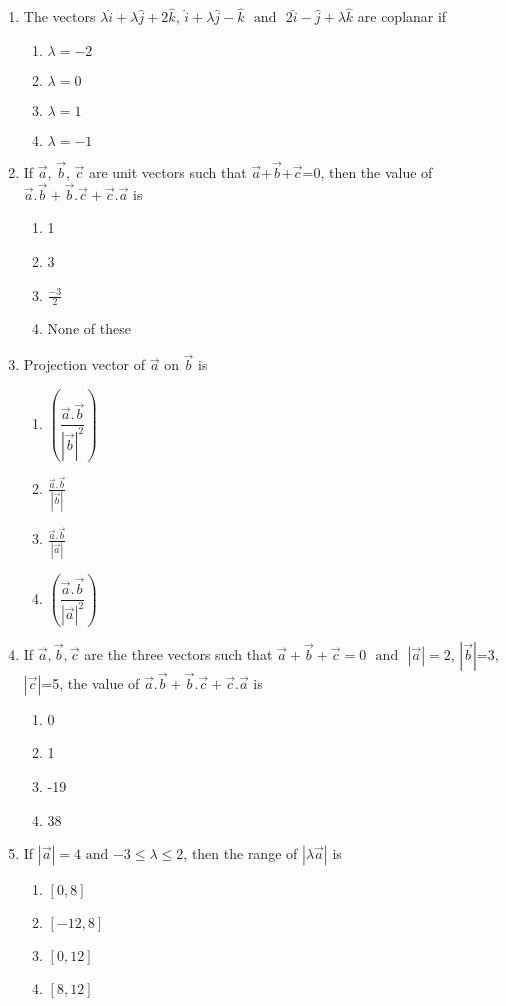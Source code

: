 \documentclass{article}
\providecommand{\abs}[1]{\left\vert#1\right\vert}
\begin{document}
\begin{enumerate}
\item The vectors $\lambda\hat{i}+\lambda\hat{j}+2\hat{k}$, $\hat{i}+\lambda\hat{j}-\hat{k}$ $\text{ and }$ $2\hat{i}-\hat{j}+\lambda\hat{k}$ are coplanar if
	\begin{enumerate}
\item	$\lambda=-2$
\item $\lambda=0$
\item $\lambda=1$
\item	$\lambda=-1$
\end{enumerate}


\item If $\vec{a}$, $\vec{b}$, $\vec{c}$ are unit vectors such that $\vec{a}$+$\vec{b}$+$\vec{c}$=0, then the value of $\vec{a}.\vec{b}+\vec{b}.\vec{c}+\vec{c}.\vec{a}$ is
	\begin{enumerate}
\item 1
\item 3
\item $\frac{-3}{2}$
\item None of these
\end{enumerate}



\item Projection vector of $\vec{a}$ on $\vec{b}$ is
	\begin{enumerate}
\item $\left(\dfrac{\vec{a}.\vec{b}}{\abs{\vec{b}}^2}\right)$
\item $\frac{\vec{a}.\vec{b}}{\abs{\vec{b}}}$
\item $\frac{\vec{a}.\vec{b}}{\abs{\vec{a}}}$
\item $\left(\dfrac{\vec{a}.\vec{b}}{\abs{\vec{a}}^2}\right)$
\end{enumerate}



\item If $\vec{a},\vec{b},\vec{c}$ are the three vectors such that $\vec{a}+\vec{b}+\vec{c}=0$ $\text{ and }$ $|\vec{a}|=2$, $|\vec{b}|$=3, $|\vec{c}|$=5, the value of $\vec{a}.\vec{b}+\vec{b}.\vec{c}+\vec{c}.\vec{a}$ is
	\begin{enumerate}
\item 0
\item 1	
\item -19
\item 38
\end{enumerate}



\item If $|\vec{a}|=4$ $\text{and}$  $-3\leq\lambda\leq2$, then the range of $|\lambda\vec{a}|$ is
	\begin{enumerate}
\item $\left[0,8\right]$
\item $\left[-12,8\right]$
\item $\left[0,12\right]$	
\item $\left[8,12\right]$
\end{enumerate}


\end{enumerate}
\end{document}
